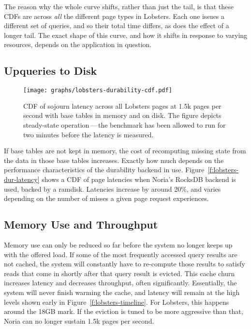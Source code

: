 The reason why the whole curve shifts, rather than just the tail, is that these
CDFs are across \emph{all} the different page types in Lobsters. Each one issues
a different set of queries, and so their total time differs, as does the effect
of a longer tail. The exact shape of this curve, and how it shifts in response
to varying resources, depends on the application in question.

\subsection{Upqueries to Disk}

\begin{figure}[h]
  \centering
  \texttt{[image: graphs/lobsters-durability-cdf.pdf]}
  \caption{CDF of sojourn latency across all Lobsters pages at 1.5k pages per
  second with base tables in memory and on disk. The figure depicts steady-state
  operation\,---\,the benchmark has been allowed to run for two minutes before
  the latency is measured.}
  \label{f:lobsters-dur-latency}
\end{figure}

If base tables are not kept in memory, the cost of recomputing missing state
from the data in those base tables increases. Exactly how much depends on the
performance characteristics of the durability backend in use.
Figure~\vref{f:lobsters-dur-latency} shows a CDF of page latencies when Noria's
RocksDB backend is used, backed by a ramdisk. Latencies increase by around 20\%,
and varies depending on the number of misses a given page request experiences.

\subsection{Memory Use and Throughput}

Memory use can only be reduced so far before the system no longer keeps up with
the offered load. If some of the most frequently accessed query results are not
cached, the system will constantly have to re-compute those results to satisfy
reads that come in shortly after that query result is evicted. This cache churn
increases latency and decreases throughput, often significantly. Essentially,
the system will never finish warming the cache, and latency will remain at the
high levels shown early in Figure~\ref{f:lobsters-timeline}. For Lobsters, this
happens around the 18GB mark. If the eviction is tuned to be more aggressive
than that, Noria can no longer sustain 1.5k pages per second.

